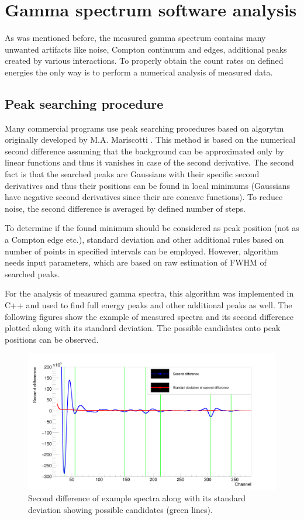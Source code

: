 \chapter{Gamma spectrum software analysis}
As was mentioned before, the measured gamma spectrum contains many unwanted artifacts like noise, Compton continuum and edges, additional peaks created by various interactions. To properly obtain the count rates on defined energies the only way is to perform a numerical analysis of measured data.


\section{Peak searching procedure}
Many commercial programs use peak searching procedures based on algorytm originally developed by M.A. Mariscotti \cite{MARISCOTTI1967309}. This method is based on the numerical second difference assuming that the background can be approximated only by linear functions and thus it vanishes in case of the second derivative. The second fact is that the searched peaks are Gaussians with their specific second derivatives and thus their positions can be found in local minimums (Gaussians have negative second derivatives since their are concave functions). To reduce noise, the second difference is averaged by defined number of steps.
\par
To determine if the found minimum should be considered as peak position (not as a Compton edge etc.), standard deviation and other additional rules based on number of points in specified intervals can be employed. However, algorithm needs input parameters, which are based on raw estimation of FWHM of searched peaks.
\par
For the analysis of measured gamma spectra, this algorithm was implemented in C++ and used to find full energy peaks and other additional peaks as well. The following figures show the example of measured spectra and its second difference plotted along with its standard deviation. The possible candidates onto peak positions can be observed.
\par


\begin{figure}[H]
 \centering
 \includegraphics[scale=0.105, angle = 0]{./pictures/SecondDerivGraph.png}
 \caption{Second difference of example spectra along with its standard deviation showing possible candidates (green lines).}
 \label{secondDerivative}
 
\end{figure}

